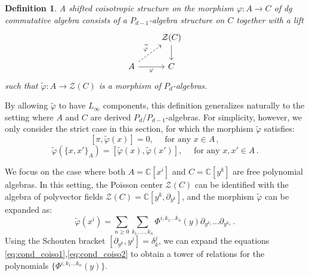 \documentclass[11pt]{article}
\newcommand{\C}{\mathbb{C}}
\numberwithin{equation}{section}
\newtheorem{definition}{Definition}[section]
\begin{document}
\begin{definition}
A shifted coisotropic structure on the morphism $\varphi\colon A \to C$ of dg commutative algebra consists of a $P_{d-1}$-algebra structure on $C$ together with a lift
\begin{equation}
\begin{tikzcd}
 ~  & \mathcal{Z}(C) \arrow[d] \\
A \arrow[dashed, ur, "\widetilde \varphi"]\arrow[r, "\varphi"']  & C
\end{tikzcd}
\end{equation}
such that $\widetilde \varphi\colon A\to \mathcal{Z}(C)$ is a morphism of $P_d$-algebras.
\end{definition}

By allowing $\widetilde{\varphi}$ to have $L_\infty$ components, this definition generalizes naturally to the setting where $A$ and $C$ are derived $P_d/P_{d-1}$-algebras. For simplicity, however, we only consider the strict case in this section, for which the morphism $\widetilde{\varphi}$ satisfies:
\begin{equation}\label{eq:cond_coiso1}
[\pi, \widetilde{\varphi}(x)] = 0,\quad \text{ for any }x \in A\,,
\end{equation}
\begin{equation}\label{eq:cond_coiso2}
\widetilde{\varphi}(\{x,x'\}_A) = [\widetilde{\varphi}(x), \widetilde{\varphi}(x')],\quad \text{ for any }x,x'\in A\,.
\end{equation}


We focus on the case where both $A = \C[x^i]$ and $C = \C[y^k]$ are free polynomial algebras. In this setting, the Poisson center $\mathcal{Z}(C)$ can be identified with the algebra of polyvector fields $\mathcal{Z}(C) = \C[y^k,\partial_{y^k}]$, and the morphism $\widetilde \varphi$ can be expanded as:
\begin{equation}
\widetilde \varphi(x^i) = \sum_{n\geq 0}\sum_{k_1,\dots,k_{n}}\Phi^{i,k_1 \dots k_{n}}(y)\partial_{y^{k_1}}\dots \partial_{y^{k_{n}}}\,.
\end{equation}
Using the Schouten bracket $[\partial_{y^k}, y^j] = \delta^j_k$, we can expand the equations \eqref{eq:cond_coiso1},\eqref{eq:cond_coiso2} to obtain a tower of relations for the polynomials $\{\Phi^{i,k_1 \dots k_{n}}(y)\}$.
\end{document}
